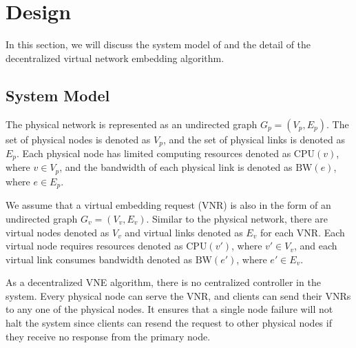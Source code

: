 \section{Design}
In this section, we will discuss the system model of {\ourAlgName} and the detail of the decentralized virtual network embedding algorithm.




\subsection{System Model}
The physical network is represented as an undirected graph \(G_p = (V_p, E_p)\). The set of physical nodes is denoted as \(V_p\), and the set of physical links is denoted as \(E_p\). Each physical node has limited computing resources denoted as \(\text{CPU}(v)\), where \(v \in V_p\), and the bandwidth of each physical link is denoted as \(\text{BW}(e)\), where \(e \in E_p\).

We assume that a virtual embedding request (VNR) is also in the form of an undirected graph \(G_v = (V_v, E_v)\). Similar to the physical network, there are virtual nodes denoted as \(V_v\) and virtual links denoted as \(E_v\) for each VNR. Each virtual node requires resources denoted as \(\text{CPU}(v')\), where \(v' \in V_v\), and each virtual link consumes bandwidth denoted as \(\text{BW}(e')\), where \(e' \in E_v\).


As a decentralized VNE algorithm, there is no centralized controller in the system. Every physical node can serve the VNR, and clients can send their VNRs to any one of the physical nodes. It ensures that a single node failure will not halt the system since clients can resend the request to other physical nodes if they receive no response from the primary node. 

